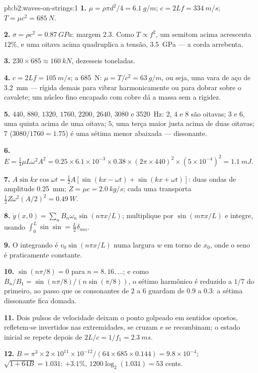 \begin{solution}{pb:b2:waves-on-strings:1}
\textbf{1.} $\mu = \rho\pi d^2/4 = \qty{6.1}{g/m}$; $c = 2Lf = \qty{334}{m/s}$; $T = \mu c^2
= \qty{685}{N}$.

\textbf{2.} $\sigma = \rho c^2 = \qty{0.87}{GPa}$: margem $2.3$. Como $T \propto f^2$, um
semitom acima acrescenta $12\%$, e uma oitava acima quadruplica a tensão,
\qty{3.5}{GPa} --- a corda arrebenta.

\textbf{3.} $230 \times 685 \approx \qty{160}{kN}$, dezesseis toneladas.

\textbf{4.} $c = 2Lf = \qty{105}{m/s}$; a \qty{685}{N}: $\mu = T/c^2 = \qty{63}{g/m}$,
ou seja, uma vara de aço de \qty{3.2}{mm} --- rígida demais para vibrar
harmonicamente ou para dobrar sobre o cavalete; um núcleo fino encapado com cobre
dá a massa sem a rigidez.

\textbf{5.} $440$, $880$, $1320$, $1760$, $2200$, $2640$, $3080$ e \qty{3520}{Hz}: $2$,
$4$ e $8$ são oitavas; $3$ e $6$, uma quinta acima de uma oitava; $5$, uma terça
maior justa acima de duas oitavas; $7$ ($3080/1760 = 1.75$) é uma sétima
menor abaixada --- dissonante.

\textbf{6.} $E = \tfrac14\mu L\omega^2A^2 = 0.25 \times 6.1 \times 10^{-3} \times 0.38 \times (2\pi
\times 440)^2 \times (5 \times 10^{-4})^2 = \qty{1.1}{mJ}$.

\textbf{7.} $A\sin kx\cos\omega t = \tfrac12A[\sin(kx - \omega t) + \sin(kx + \omega t)]$: duas
ondas de amplitude \qty{0.25}{mm}; $Z = \mu c = \qty{2.0}{kg/s}$; cada uma transporta
$\tfrac12Z\omega^2(A/2)^2 = \qty{0.49}{W}$.

\textbf{8.} $\dot y(x, 0) = \sum_nB_n\omega_n\sin(n\pi x/L)$; multiplique por
$\sin(m\pi x/L)$ e integre, usando $\int_0^L\sin\sin = \tfrac L2\delta_{mn}$.

\textbf{9.} O integrando é $v_0\sin(n\pi x/L)$ numa largura $w$ em torno de $x_0$,
onde o seno é praticamente constante.

\textbf{10.} $\sin(n\pi/8) = 0$ para $n = 8, 16, \dots$; e como $B_n/B_1 =
\sin(n\pi/8)/(n\sin(\pi/8))$, o sétimo harmônico é reduzido a $1/7$ do
primeiro, ao passo que os consonantes de $2$ a $6$ guardam de $0.9$ a $0.3$: a
sétima dissonante fica domada.

\textbf{11.} Dois pulsos de velocidade deixam o ponto golpeado em sentidos
opostos, refletem-se invertidos nas extremidades, se cruzam e se recombinam; o
estado inicial se repete depois de $2L/c = 1/f_1 = \qty{2.3}{ms}$.

\textbf{12.} $B = \pi^3 \times 2 \times 10^{11} \times 10^{-12}/(64 \times 685 \times 0.144) =
9.8 \times 10^{-4}$; $\sqrt{1 + 64B} = 1.031$: $+3.1\%$, $1200\log_2(1.031) = 53$ cents.


\end{solution}
